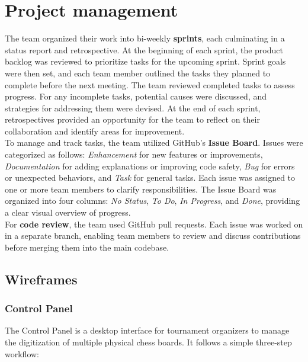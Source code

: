 \section{Project management}
\label{sec:methods-project-management}

The team organized their work into bi-weekly \textbf{sprints}, each culminating in a status report and retrospective. At the beginning of each sprint, the product backlog was reviewed to prioritize tasks for the upcoming sprint. Sprint goals were then set, and each team member outlined the tasks they planned to complete before the next meeting. The team reviewed completed tasks to assess progress. For any incomplete tasks, potential causes were discussed, and strategies for addressing them were devised. At the end of each sprint, retrospectives provided an opportunity for the team to reflect on their collaboration and identify areas for improvement. \\

To manage and track tasks, the team utilized GitHub’s \textbf{Issue Board}. Issues were categorized as follows: \textit{Enhancement} for new features or improvements, \textit{Documentation} for adding explanations or improving code safety, \textit{Bug} for errors or unexpected behaviors, and \textit{Task} for general tasks. Each issue was assigned to one or more team members to clarify responsibilities. The Issue Board was organized into four columns: \textit{No Status}, \textit{To Do}, \textit{In Progress}, and \textit{Done}, providing a clear visual overview of progress. \\

For \textbf{code review}, the team used GitHub pull requests. Each issue was worked on in a separate branch, enabling team members to review and discuss contributions before merging them into the main codebase.

\subsection{Wireframes}
\label{subsec:wireframe}

\subsubsection*{Control Panel}

The Control Panel is a desktop interface for tournament organizers to manage the digitization of multiple physical chess boards. It follows a simple three-step workflow:

